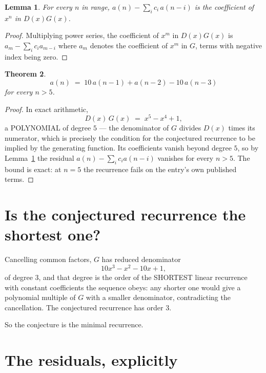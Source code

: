 \documentclass[11pt,a4paper]{article}
\theoremstyle{plain}
\newtheorem{theorem}{Theorem}
\newtheorem{lemma}[theorem]{Lemma}
\theoremstyle{definition}
\begin{document}
\begin{lemma}\label{lem:key}
For every $n$ in range, $a(n)-\sum_i c_i\,a(n-i)$ is the coefficient of $x^{n}$ in
$D(x)G(x)$.
\end{lemma}

\begin{proof}
Multiplying power series, the coefficient of $x^{m}$ in $D(x)G(x)$ is
$a_m-\sum_i c_i a_{m-i}$ where $a_m$ denotes the coefficient of $x^{m}$ in $G$, terms with
negative index being zero.
\end{proof}

\begin{theorem}
\[
a(n)\;=\;10\,a(n-1) + a(n-2) - 10\,a(n-3)
\]
for every $n>5$.
\end{theorem}

\begin{proof}
In exact arithmetic,
\[
D(x)\,G(x)\;=\;x^{5} - x^{4} + 1,
\]
a POLYNOMIAL of degree $5$ --- the denominator of $G$ divides $D(x)$ times its numerator,
which is precisely the condition for the conjectured recurrence to be implied by the
generating function. Its coefficients vanish beyond degree $5$, so by
Lemma~\ref{lem:key} the residual $a(n)-\sum_ic_ia(n-i)$ vanishes for every
$n>5$. The bound is exact: at $n=5$ the recurrence fails on the entry's own published terms.
\end{proof}

\section{Is the conjectured recurrence the shortest one?}

Cancelling common factors, $G$ has reduced denominator
\[
10 x^{3} - x^{2} - 10 x + 1,
\]
of degree $3$, and that degree is the order of the SHORTEST linear recurrence with
constant coefficients the sequence obeys: any shorter one would give a polynomial multiple of
$G$ with a smaller denominator, contradicting the cancellation. The conjectured recurrence has
order $3$.

So the conjecture is the minimal recurrence.

\section{The residuals, explicitly}
\end{document}
